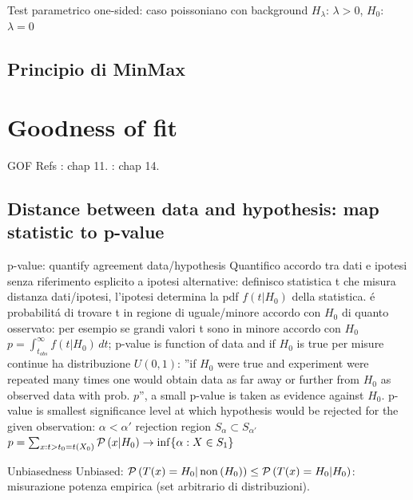 \documentclass[asd-beamer.tex]{subfiles}
\begin{document}
\begin{frame}{Test parametrico one-sided: caso poissoniano con background}
$H_{\lambda}$: $\lambda>0$, $H_0$: $\lambda=0$
\end{frame}

\subsection{Principio di MinMax}

\begin{frame}{}

\end{frame}

\section{Goodness of fit}

\begin{wordonframe}{GOF Refs}
\cite{james2006statistical}: chap 11. \cite{lehmann2006testing}: chap 14.

\end{wordonframe}

\subsection{Distance between data and hypothesis: map statistic to p-value}

\begin{frame}{p-value: quantify agreement data/hypothesis}
Quantifico accordo tra dati e ipotesi senza riferimento esplicito a ipotesi alternative: definisco statistica t che misura distanza dati/ipotesi, l'ipotesi determina la pdf $f(t|H_0)$ della statistica.  \'e probabilit\'a di trovare t in regione di uguale/minore accordo con $H_0$ di quanto osservato: per esempio se grandi valori t sono in minore accordo con $H_0$ $p=\int_{t_{obs}}^{\infty}f(t|H_0)\,dt$; p-value is function of data and if $H_0$ is true per misure continue ha distribuzione $U(0,1)$: ''if $H_0$ were true and experiment were repeated many times one would obtain data as far away or further from $H_0$ as observed data with prob. $p$'', a small p-value is taken as evidence against $H_0$.
p-value is smallest significance level at which hypothesis would be rejected for the given observation: $\alpha<\alpha'$ rejection region $S_{\alpha}\subset S_{\alpha'}$ $p=\sum_{x:t>t_0=t(X_0)}\operatorname{\mathcal{P}}{(x|H_0)}\to\inf\{\alpha: X\in S_1\}$
\begin{block}{Unbiasedness}
Unbiased: $\operatorname{\mathcal{P}}{(T(x)=H_0|\operatorname{non}{(H_0)})}\leq\operatorname{\mathcal{P}}{(T(x)=H_0|H_0)}$: misurazione potenza empirica (set arbitrario di distribuzioni).
\end{block}
\end{frame}
\end{document}
